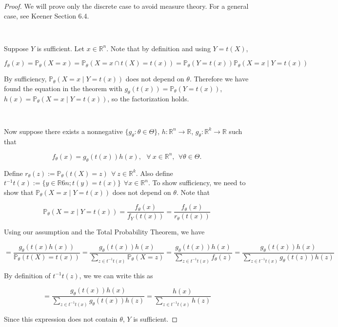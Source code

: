 \begin{proof} We will prove only the discrete case to avoid measure theory. For a general case, see Keener Section 6.4. 

\

Suppose \(Y\) is sufficient. Let \(x \in \mathbb{R}^n\). Note that by definition and using \(Y = t(X)\),

\[
f_\theta(x) = \mathbb{P}_\theta (X = x) = \mathbb{P}_\theta (X = x \cap t(X) = t(x)) = \mathbb{P}_\theta ( Y = t(x))   \mathbb{P}_\theta (X = x \mid Y = t(x)) 
\]

By sufficiency, \( \mathbb{P}_\theta (X = x \mid Y = t(x)) \) does not depend on \(\theta\). Therefore we have found the equation in the theorem with \(g_\theta(t(x)) = \mathbb{P}_\theta ( Y = t(x))  \), \(h(x) = \mathbb{P}_\theta (X = x \mid Y = t(x))  \), so the factorization holds.

\

Now suppose there exists a nonnegative \(\{g_\theta: \theta \in \Theta\}\), \(h: \mathbb{R}^n \to \mathbb{R}\), \(g_\theta: \mathbb{R}^k \to \mathbb{R}\) such that

\[
f_\theta(x) = g_\theta(t(x)) h(x), \ \ \ \forall \ x \in \mathbb{R}^n, \ \ \forall \theta \in \Theta.
\]

Define \(r_\theta(z) := \mathbb{P}_\theta(t(X) = z)  \ \ \forall \ z \in \mathbb{R}^k\).  Also define \(t^{-1} t(x) := \{y \in \mathbb{R}6n; t(y) = t(x) \} \ \ \forall x \in \mathbb{R}^n\). To show sufficiency, we need to show that \(\mathbb{P}_\theta (X = x \mid Y = t(x))\) does not depend on \(\theta\). Note that

\[
\mathbb{P}_\theta (X = x \mid Y = t(x)) = \frac{f_\theta(x)}{f_Y(t(x))}= \frac{f_\theta(x)}{r_\theta(t(x))}
\]

Using our assumption and the Total Probability Theorem, we have

\[
= \frac{ g_\theta(t(x) h(x))}{\mathbb{P}_\theta(t(X) = t(x))} = \frac{ g_\theta(t(x)) h(x)}{\sum_{z \in t^{-1} t(x)} \mathbb{P}_\theta (X = z)} = \frac{ g_\theta(t(x)) h(x)}{\sum_{z \in t^{-1} t(x)} f_\theta(z)}  = \frac{ g_\theta(t(x)) h(x)}{\sum_{z \in t^{-1} t(x)}  g_\theta(t(z)) h(z) }
\]

By definition of \(t^{-1}t(z)\), we we can write this as

\[
= \frac{ g_\theta(t(x)) h(x)}{\sum_{z \in t^{-1} t(x)}  g_\theta(t(x)) h(z) } = \frac{  h(x)}{\sum_{z \in t^{-1} t(x)}   h(z) }
\]

Since this expression does not contain \(\theta\), \(Y\) is sufficient.

\end{proof}

